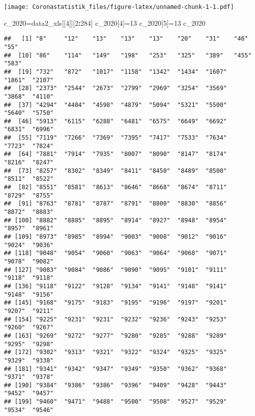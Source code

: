 \documentclass[
]{article}
\newenvironment{Shaded}{\begin{snugshade}}{\end{snugshade}}
\newcommand{\DecValTok}[1]{\textcolor[rgb]{0.00,0.00,0.81}{#1}}
\newcommand{\NormalTok}[1]{#1}
\newcommand{\OperatorTok}[1]{\textcolor[rgb]{0.81,0.36,0.00}{\textbf{#1}}}
\begin{document}
\texttt{[image: Coronastatistik\_files/figure-latex/unnamed-chunk-1-1.pdf]}

\begin{Shaded}
\begin{Highlighting}[]
\NormalTok{c_}\DecValTok{2020}\NormalTok{=data2_xls[[}\DecValTok{4}\NormalTok{]][}\DecValTok{2}\OperatorTok{:}\DecValTok{284}\NormalTok{]}
\NormalTok{c_}\DecValTok{2020}\NormalTok{[}\DecValTok{4}\NormalTok{]=}\DecValTok{13}
\NormalTok{c_}\DecValTok{2020}\NormalTok{[}\DecValTok{5}\NormalTok{]=}\DecValTok{13}
\NormalTok{c_}\DecValTok{2020}
\end{Highlighting}
\end{Shaded}

\begin{verbatim}
##   [1] "8"     "12"    "13"    "13"    "13"    "20"    "31"    "46"    "55"   
##  [10] "86"    "114"   "149"   "198"   "253"   "325"   "389"   "455"   "583"  
##  [19] "732"   "872"   "1017"  "1158"  "1342"  "1434"  "1607"  "1861"  "2107" 
##  [28] "2373"  "2544"  "2673"  "2799"  "2969"  "3254"  "3569"  "3868"  "4110" 
##  [37] "4294"  "4404"  "4598"  "4879"  "5094"  "5321"  "5500"  "5640"  "5750" 
##  [46] "5913"  "6115"  "6288"  "6481"  "6575"  "6649"  "6692"  "6831"  "6996" 
##  [55] "7119"  "7266"  "7369"  "7395"  "7417"  "7533"  "7634"  "7723"  "7824" 
##  [64] "7881"  "7914"  "7935"  "8007"  "8090"  "8147"  "8174"  "8216"  "8247" 
##  [73] "8257"  "8302"  "8349"  "8411"  "8450"  "8489"  "8500"  "8511"  "8522" 
##  [82] "8551"  "8581"  "8613"  "8646"  "8668"  "8674"  "8711"  "8729"  "8755" 
##  [91] "8763"  "8781"  "8787"  "8791"  "8800"  "8830"  "8856"  "8872"  "8883" 
## [100] "8882"  "8885"  "8895"  "8914"  "8927"  "8948"  "8954"  "8957"  "8961" 
## [109] "8973"  "8985"  "8994"  "9003"  "9008"  "9012"  "9016"  "9024"  "9036" 
## [118] "9048"  "9054"  "9060"  "9063"  "9064"  "9068"  "9071"  "9078"  "9082" 
## [127] "9083"  "9084"  "9086"  "9090"  "9095"  "9101"  "9111"  "9118"  "9118" 
## [136] "9118"  "9122"  "9128"  "9134"  "9141"  "9148"  "9141"  "9148"  "9156" 
## [145] "9168"  "9175"  "9183"  "9195"  "9196"  "9197"  "9201"  "9207"  "9211" 
## [154] "9225"  "9231"  "9231"  "9232"  "9236"  "9243"  "9253"  "9260"  "9267" 
## [163] "9269"  "9272"  "9277"  "9280"  "9285"  "9288"  "9289"  "9295"  "9298" 
## [172] "9302"  "9313"  "9321"  "9322"  "9324"  "9325"  "9325"  "9329"  "9338" 
## [181] "9341"  "9342"  "9347"  "9349"  "9350"  "9362"  "9368"  "9371"  "9378" 
## [190] "9384"  "9386"  "9386"  "9396"  "9409"  "9428"  "9443"  "9452"  "9457" 
## [199] "9460"  "9471"  "9488"  "9500"  "9508"  "9527"  "9529"  "9534"  "9546" 

\end{verbatim}
\end{document}
